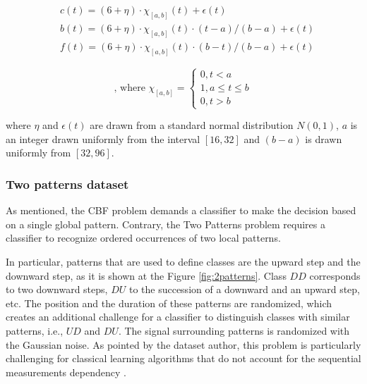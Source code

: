 \noindent\begin{minipage}{.5\linewidth}
\begin{equation*}
\begin{split}
 &c(t)=(6+\eta)\cdot\chi_{[a,b]}(t)+\epsilon(t) \\
 & b(t)=(6+\eta)\cdot\chi_{[a,b]}(t)\cdot(t-a)/(b-a)+\epsilon(t) \\
 & f(t)=(6+\eta)\cdot\chi_{[a,b]}(t)\cdot(b-t)/(b-a)+\epsilon(t)
\end{split}
\end{equation*}
\end{minipage}%
\begin{minipage}{.5\linewidth}
\begin{equation}
\label{eq:cbf}
\text{, where }
\chi_{[a,b]}=\begin{cases}
0,t < a \\
1,a\leq t\leq b\\
0,t > b \end{cases}
\end{equation}
\end{minipage}

\noindent where $\eta$ and $\epsilon(t)$ are drawn from a standard normal distribution $N(0,1)$, $a$ is an integer 
drawn uniformly from the interval $[16,32]$ and $(b-a)$ is drawn uniformly from $[32,96]$.

\subsubsection{Two patterns dataset}
As mentioned, the CBF problem demands a classifier to make the decision based on a single global pattern. 
Contrary, the Two Patterns problem requires a classifier to recognize ordered occurrences of two local patterns.

In particular, patterns that are used to define classes are the upward step and the downward step,
as it is shown at the Figure \ref{fig:2patterns}. Class $DD$ corresponds to two downward steps, $DU$ to the succession
of a downward and an upward step, etc. The position and the duration of these patterns are randomized, 
which creates an additional challenge for a classifier to distinguish classes with similar patterns, i.e., $UD$ and $DU$.
The signal surrounding patterns is randomized with the Gaussian noise. 
As pointed by the dataset author, this problem is particularly challenging for classical learning 
algorithms that do not account for the sequential measurements dependency \cite{two_patterns}.

